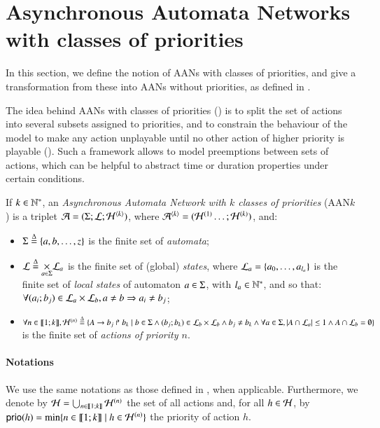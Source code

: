 \section{Asynchronous Automata Networks with classes of priorities}
\label{sec:flattening}

In this section, we define the notion of AANs with classes of priorities,
and give a transformation from these into
AANs without priorities, as defined in .

The idea behind AANs with classes of priorities ()
is to split the set of actions into several subsets assigned to priorities,
and to constrain the behaviour of the model to make any action unplayable
until no other action of higher priority is playable ().
Such a framework allows to model preemptions between sets of actions,
which can be helpful to abstract time or duration properties under certain conditions.

\begin{definition}
\label{def:php}
  If $k \in \mathbb{N}^*$,
  an \emph{Asynchronous Automata Network with $k$ classes of priorities} (AAN$k$)
  is a triplet $\mathcal{A} = (\Sigma; \mathcal{L}; \mathcal{H}^{{\langle k \rangle}})$,
  where $\mathcal{A}^{{\langle k \rangle}} = (\mathcal{H}^{(1)} \dots; \mathcal{H}^{(k)})$,
  and:
  \begin{itemize}
    \item $\Sigma \stackrel{\Delta}= \{a, b, \dots, z\}$ is the finite set of \emph{automata};
    \item $\mathcal{L} \stackrel{\Delta}= \underset{a \in \Sigma}{\times} \mathcal{L}_a$ is the finite set of
      (global) \emph{states},
      where $\mathcal{L}_a = \{a_0, \ldots, a_{l_a}\}$ is the finite set of \emph{local states}
      of automaton $a \in \Sigma$, with $l_a \in \mathbb{N}^*$,
      and so that:
      $\forall (a_i; b_j) \in \mathcal{L}_a \times \mathcal{L}_b, a \neq b \Rightarrow a_i \neq b_j$;
    \item $\forall n \in \llbracket 1; k \rrbracket,
      \mathcal{H}^{(n)} \stackrel{\Delta}= \{A\rightarrow b_j\Rsh b_k \mid
      b \in \Sigma \wedge (b_j; b_k) \in \mathcal{L}_b \times \mathcal{L}_b \wedge
      b_j \neq b_k \wedge
      \forall a \in \Sigma, |A \cap \mathcal{L}_a| \leq 1 \wedge
      A \cap \mathcal{L}_b = \emptyset \}$ is the finite set of \emph{actions of priority $n$}.
  \end{itemize}
\end{definition}

\paragraph{Notations}
We use the same notations as those defined in , when applicable.
Furthermore,
we denote by $\mathcal{H} = \bigcup_{n \in \llbracket 1; k \rrbracket} \mathcal{H}^{(n)}$ the set of all actions
and, for all $h \in \mathcal{H}$,
by $\mathsf{prio}(h) = \min\{ n \in \llbracket 1; k \rrbracket \mid h \in \mathcal{H}^{(n)} \}$
the priority of action $h$.


